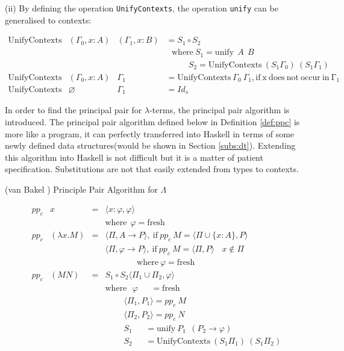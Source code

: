 \noindent (ii) By defining the operation \texttt{UnifyContexts}, the operation \texttt{unify} can be generalised to contexts:

\begin{equation*}
\begin{array}{llll}
\mathrm{UnifyContexts} & (\Gamma _0,x:A) & (\Gamma _1,x:B) & = S_1\circ S_2\\
&&&\ \ \ \mathrm{where}\ S_1 = \mathrm{unify}\ \ A\ \ B\\
&&&\ \ \ \ \ \ \ \ \ \ \ \ S_2 = \mathrm{UnifyContexts}\ (S_1\Gamma _0)\ (S_1\Gamma _1)\\
\mathrm{UnifyContexts} & (\Gamma _0,x:A) & \Gamma _1 & = \mathrm{UnifyContexts}\ \Gamma _0\ \Gamma _1, \mathrm{if\ x\ does\ not\ occur\ in\ \Gamma _1}\\
\mathrm{UnifyContexts} & \varnothing & \Gamma _1 & =  Id_s
\end{array}
\end{equation*}


In order to find the principal pair for $\lambda$-terms, the principal pair algorithm is introduced. The principal pair algorithm defined below in Definition \ref{def:ppc} is more like a program, it can perfectly transferred into Haskell in terms of some newly defined data structures(would be shown in Section \ref{subs:dt}). Extending this algorithm into Haskell is not difficult but it is a matter of patient specification. Substitutions are not that easily extended from types to contexts. 

\begin{def1}{\label{def:ppc}}
\normalfont (van Bakel \cite{svb2001type}) Principle  Pair  Algorithm  for  $\Lambda$
\end{def1}

\begin{equation*}
\begin{array}{llll}
pp_c & x & = & \langle x:\varphi,\varphi \rangle\\
&&& \mathrm{where}\ \ \varphi=\mathrm{fresh}\\
pp_c & (\lambda x.M) & = & \langle \Pi,A \rightarrow P \rangle,\ \mathrm{if}\ pp_c\ M=\langle \Pi \cup \{x:A\},P \rangle\\
&&& \langle \Pi,\varphi \rightarrow P \rangle,\ \mathrm{if}\ pp_c\ M=\langle \Pi ,P \rangle\ \ \ \ x\not\in \Pi\\
&&&\ \ \ \ \ \ \ \ \ \ \ \ \ \ \ \ \ \mathrm{where}\ \varphi=\mathrm{fresh}\\
pp_c & (MN) & = & S_1\circ S_2\langle \Pi _1\cup \Pi _2,\varphi \rangle\\
&&& \mathrm{where}\ \ \ \varphi \ \ \ \ \ \ \ = \mathrm{fresh}\\
&&& \ \ \ \ \ \ \ \ \ \ \langle \Pi _1,P_1\rangle = pp_c\ M\\
&&& \ \ \ \ \ \ \ \ \ \ \langle \Pi _2,P_2\rangle = pp_c\ N\\
&&& \ \ \ \ \ \ \ \ \ \ S_1 \ \ \ \ \ \ \ = \mathrm{unify}\ P_1\ \ (P_2 \rightarrow \varphi)\\
&&& \ \ \ \ \ \ \ \ \ \ S_2 \ \ \ \ \ \ \ = \mathrm{UnifyContexts}\ (S_1\Pi _1)\ (S_1\Pi _2)\\
\end{array}
\end{equation*}

